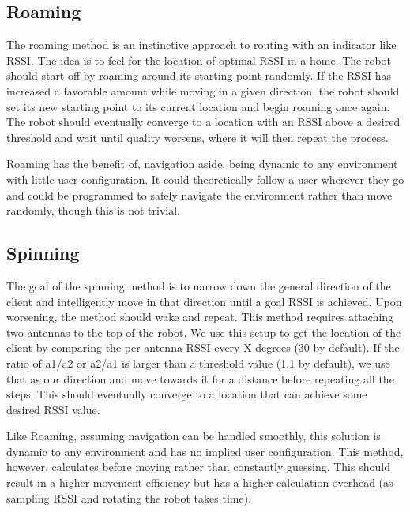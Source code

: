 \subsection{Roaming}
The roaming method is an instinctive approach to routing with an indicator like RSSI. The idea is to feel for the location of optimal RSSI in a home. The robot should start off by roaming around its starting point randomly. If the RSSI has increased a favorable amount while moving in a given direction, the robot should set its new starting point to its current location and begin roaming once again. The robot should eventually converge to a location with an RSSI above a desired threshold and wait until quality worsens, where it will then repeat the process.\par
Roaming has the benefit of, navigation aside, being dynamic to any environment with little user configuration. It could theoretically follow a user wherever they go and could be programmed to safely navigate the environment rather than move randomly, though this is not trivial.

\subsection{Spinning}
The goal of the spinning method is to narrow down the general direction of the client and intelligently move in that direction until a goal RSSI is achieved. Upon worsening, the method should wake and repeat. This method requires attaching two antennas to the top of the robot. We use this setup to get the location of the client by comparing the per antenna RSSI every X degrees (30 by default). If the ratio of a1/a2 or a2/a1 is larger than a threshold value (1.1 by default), we use that as our direction and move towards it for a distance before repeating all the steps. This should eventually converge to a location that can achieve some desired RSSI value.\par
Like Roaming, assuming navigation can be handled smoothly, this solution is dynamic to any environment and has no implied user configuration. This method, however, calculates before moving rather than constantly guessing. This should result in a higher movement efficiency but has a higher calculation overhead (as sampling RSSI and rotating the robot takes time).


